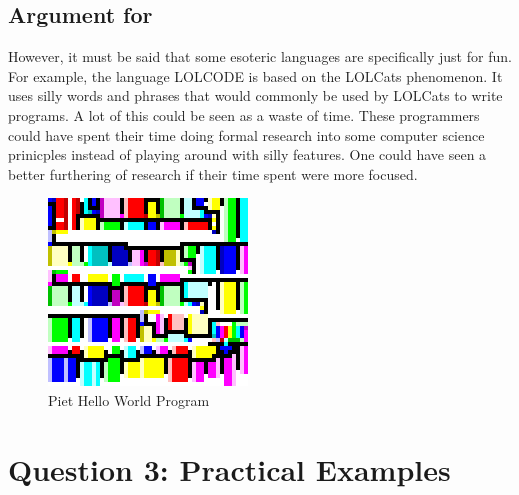 \documentclass[a4paper]{article}
\begin{document}
	\subsection{Argument for}	
	However, it must be said that some esoteric languages are specifically just for fun. For example, the language LOLCODE is based on the LOLCats phenomenon\cite{esolangArt}. It uses silly words and phrases that would commonly be used by LOLCats to write programs. A lot of this could be seen as a waste of time. These programmers could have spent their time doing formal research into some computer science prinicples instead of playing around with silly features. One could have seen a better furthering of research if their time spent were more focused. 
	
			\begin{figure}[h]
			\centering
			\includegraphics[width=200px]{helloworld-piet.png}
			\caption{Piet Hello World Program}
		\end{figure}
\section{Question 3: Practical Examples}
\end{document}
